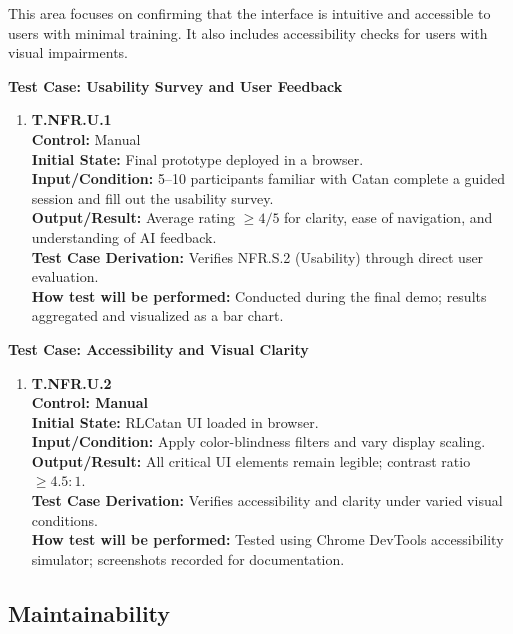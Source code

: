 \documentclass[12pt, titlepage]{article}
\begin{document}
This area focuses on confirming that the interface is intuitive and accessible to users with minimal training. It also includes accessibility checks for users with visual impairments.

\textbf{Test Case: Usability Survey and User Feedback}

\begin{enumerate}
\item \textbf{T.NFR.U.1} \\
\textbf{Control:} Manual \\
\textbf{Initial State:} Final prototype deployed in a browser. \\
\textbf{Input/Condition:} 5--10 participants familiar with Catan complete a guided session and fill out the usability survey. \\
\textbf{Output/Result:} Average rating $\geq 4/5$ for clarity, ease of navigation, and understanding of AI feedback. \\
\textbf{Test Case Derivation:} Verifies NFR.S.2 (Usability) through direct user evaluation. \\
\textbf{How test will be performed:} Conducted during the final demo; results aggregated and visualized as a bar chart.
\end{enumerate}

\textbf{Test Case: Accessibility and Visual Clarity}

\begin{enumerate}
\item \textbf{T.NFR.U.2} \\
\textbf{Control: Manual} \\
\textbf{Initial State:} RLCatan UI loaded in browser. \\
\textbf{Input/Condition:} Apply color-blindness filters and vary display scaling. \\
\textbf{Output/Result:} All critical UI elements remain legible; contrast ratio $\geq 4.5:1$. \\
\textbf{Test Case Derivation:} Verifies accessibility and clarity under varied visual conditions. \\
\textbf{How test will be performed:} Tested using Chrome DevTools accessibility simulator; screenshots recorded for documentation.
\end{enumerate}

\subsection{Maintainability}
\end{document}
